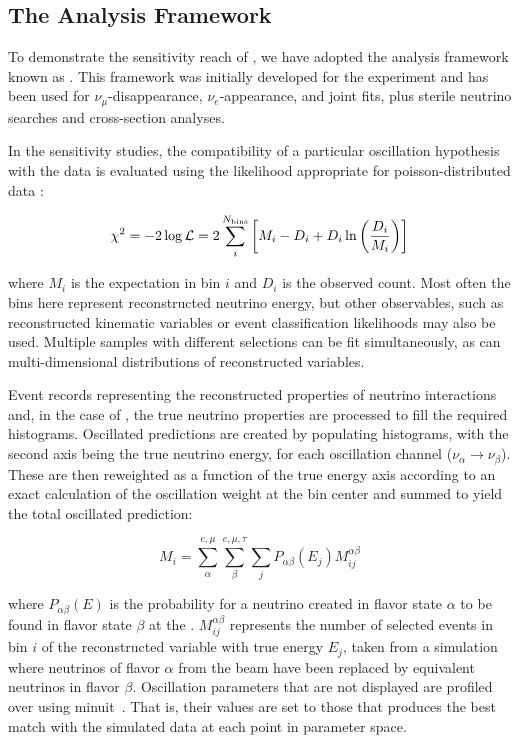 \subsection{The Analysis Framework}
\label{sect:methods-cafana}

To demonstrate the sensitivity reach of , we have adopted the analysis framework known as . This framework was initially developed for the  experiment and has been used for $\nu_\mu$-disappearance, $\nu_e$-appearance, and joint fits, plus sterile neutrino searches and cross-section analyses.

In the sensitivity studies, the compatibility of a particular oscillation hypothesis with the data is evaluated using the likelihood appropriate for poisson-distributed data \cite{PDG}:

\begin{equation}
    \chi^2 = -2\log\mathcal{L} = 2\sum_i^{N_{\rm bins}}\left[ M_i-D_i+D_i\ln\left({D_i\over M_i}\right) \right]
\end{equation}

where $M_i$ is the  %
expectation in bin $i$ and $D_i$ is the observed count. Most often the bins here represent reconstructed neutrino energy, but other observables, such as reconstructed kinematic variables or event classification likelihoods may also be used. Multiple samples with different selections can be fit simultaneously, as can multi-dimensional distributions of reconstructed variables.

Event records representing the reconstructed properties of neutrino interactions and, in the case of  , the true neutrino properties are processed to fill the required histograms. Oscillated  predictions are created by populating \twod histograms, with the second axis being the true neutrino energy, for each oscillation channel ($\nu_\alpha\to\nu_\beta$). These are then reweighted as a function of the true energy axis according to an exact calculation of the oscillation weight at the bin center %
and summed to yield the total oscillated prediction:

\begin{equation}
    M_i = \sum_\alpha^{e,\mu}\sum_\beta^{e,\mu,\tau}\sum_j P_{\alpha\beta}(E_j)M_{ij}^{\alpha\beta}
    \label{eqn:cafana_ll}
\end{equation}

where $P_{\alpha\beta}(E)$ is the probability for a neutrino created in flavor state $\alpha$ to be found in flavor state $\beta$ at the . $M_{ij}^{\alpha\beta}$ represents the number of selected events in bin $i$ of the reconstructed variable with true energy $E_j$, taken from a simulation where neutrinos of flavor $\alpha$ from the beam have been replaced by equivalent neutrinos in flavor $\beta$. Oscillation parameters that are not displayed are profiled over using {\sc minuit}~\cite{James:1994vla}. That is, their values are set to those that produces the best match with the simulated data at each point in parameter space.

